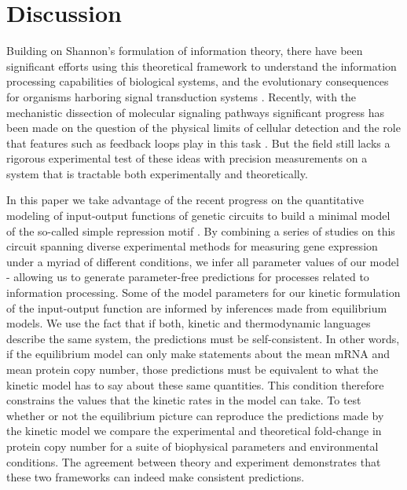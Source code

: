 \section*{Discussion}

Building on Shannon's formulation of information theory, there have been
significant efforts using this theoretical framework to understand the
information processing capabilities of biological systems, and the evolutionary
consequences for organisms harboring signal transduction systems
\cite{Bergstrom2004, Taylor2007, Tkacik2008, Polani2009, Nemenman2010,
Rivoire2011}. Recently, with the mechanistic dissection of molecular signaling
pathways significant progress has been made on the question of the physical
limits of cellular detection and the role that features such as feedback loops
play in this task \cite{Bialek2005, Libby2007, Tkacik2011, Rhee2012a,
Voliotis2014a}. But the field still lacks a rigorous experimental test of these
ideas with precision measurements on a system that is tractable both
experimentally and theoretically.

In this paper we take advantage of the recent progress on the quantitative
modeling of input-output functions of genetic circuits to build a minimal model
of the so-called simple repression motif \cite{Phillips2019}. By combining a
series of studies on this circuit spanning diverse experimental methods for
measuring gene expression under a myriad of different conditions, we infer all
parameter values of our model - allowing us to generate parameter-free
predictions for processes related to information processing. Some of the model
parameters for our kinetic formulation of the input-output function are informed
by inferences made from equilibrium models. We use the fact that if both,
kinetic and thermodynamic languages describe the same system, the predictions
must be self-consistent. In other words, if the equilibrium model can only make
statements about the mean mRNA and mean protein copy number, those predictions
must be equivalent to what the kinetic model has to say about these same
quantities. This condition therefore constrains the values that the kinetic
rates in the model can take. To test whether or not the equilibrium picture can
reproduce the predictions made by the kinetic model we compare the experimental
and theoretical fold-change in protein copy number for a suite of biophysical
parameters and environmental conditions. The agreement between theory and
experiment demonstrates that these two frameworks can indeed make consistent
predictions.

